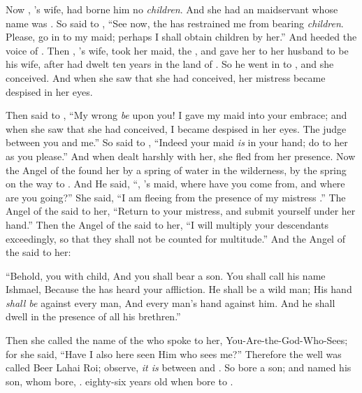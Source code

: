 
\bverse Now , 's wife, had borne him no \textit{children}. And she had an  maidservant whose name was .
\bverse So  said to , ``See now, the \lord has restrained me from bearing \textit{children}. Please, go in to my maid; perhaps I shall obtain children by her.'' And  heeded the voice of .
\bverse Then , 's wife, took  her maid, the , and gave her to her husband  to be his wife, after  had dwelt ten years in the land of \Canaan.
\bverse So he went in to , and she conceived. And when she saw that she had conceived, her mistress became despised in her eyes.

\bverse Then  said to , ``My wrong \textit{be} upon you! I gave my maid into your embrace; and when she saw that she had conceived, I became despised in her eyes. The \lord judge between you and me.''
\bverse So  said to , ``Indeed your maid \textit{is} in your hand; do to her as you please.'' And when  dealt harshly with her, she fled from her presence.
\bverse Now the Angel of the \lord found her by a spring of water in the wilderness, by the spring on the way to .
\bverse And He said, ``, 's maid, where have you come from, and where are you going?'' She said, ``I am fleeing from the presence of my mistress .''
\bverse The Angel of the \lord said to her, ``Return to your mistress, and submit yourself under her hand.''
\bverse Then the Angel of the \lord said to her, ``I will multiply your descendants exceedingly, so that they shall not be counted for multitude.''
\bverse And the Angel of the \lord said to her:
\begin{bquotation}
``Behold, you \are with child, And you shall bear a son. You shall call his name Ishmael, Because the \lord has heard your affliction. \bverse He shall be a wild man; His hand \textit{shall be} against every man, And every man's hand against him. And he shall dwell in the presence of all his brethren.''
\end{bquotation}

\bverse Then she called the name of the \lord who spoke to her, You-Are-the-God-Who-Sees; for she said, ``Have I also here seen Him who sees me?''
\bverse Therefore the well was called Beer Lahai Roi; observe, \textit{it is} between  and .
\bverse So  bore  a son; and  named his son, whom  bore, \Ishmael.
\bverse {} \was eighty-six years old when  bore \Ishmael to .
